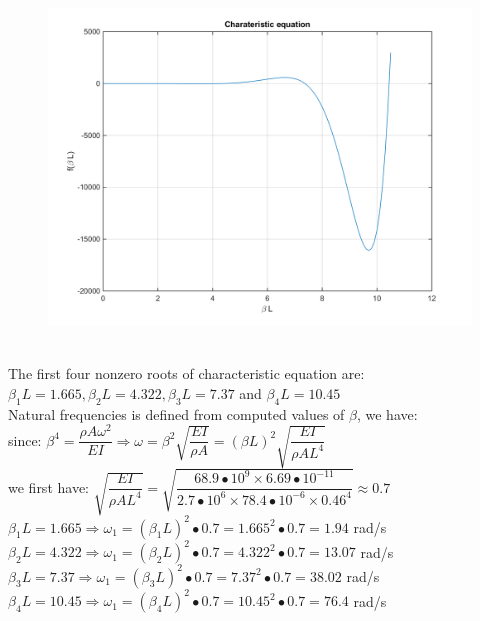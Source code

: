 \documentclass[14pt,a4paper]{article}
\begin{document}
\begin{enumerate}
\begin{figure}[htp]
		\includegraphics[scale=0.5]{hw2_VB1.png}
	\end{figure}\\
	The first four nonzero roots of characteristic equation are: $\beta_1L = 1.665, \beta_2L = 4.322, \beta_3L = 7.37 $ and $\beta_4L = 10.45$\\
	Natural frequencies is defined from computed values of $\beta$, we have:\\
	since: $ \beta^4 = \dfrac{\rho A\omega^2}{EI} \Rightarrow \omega = \beta^2\sqrt{\dfrac{EI}{\rho A}} = (\beta L)^2\sqrt{\dfrac{EI}{\rho AL^4}}$\\
	we first have: $\sqrt{\dfrac{EI}{\rho AL^4}} = \sqrt{\dfrac{68.9\bullet 10^9 \times 6.69\bullet 10^{-11}}{2.7\bullet10^6 \times 78.4\bullet10^{-6}\times 0.46^4}} \approx 0.7$\\
	$\beta_1L = 1.665 \Rightarrow \omega_1 = (\beta_1L)^2\bullet 0.7 = 1.665^2\bullet 0.7 = 1.94$ rad/s\\
	$\beta_2L = 4.322 \Rightarrow \omega_1 = (\beta_2L)^2\bullet 0.7 = 4.322^2\bullet 0.7 = 13.07$ rad/s\\
	$\beta_3L = 7.37 \Rightarrow \omega_1 = (\beta_3L)^2\bullet 0.7 = 7.37^2\bullet 0.7 = 38.02$ rad/s\\
	$\beta_4L = 10.45 \Rightarrow \omega_1 = (\beta_4L)^2\bullet 0.7 = 10.45^2\bullet 0.7 = 76.4$ rad/s\\
	

\end{enumerate}
\end{document}
